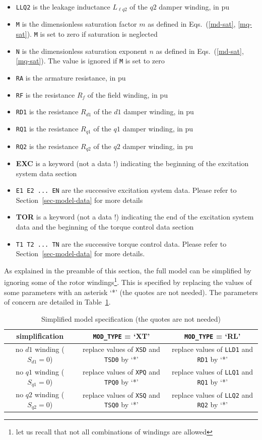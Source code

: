 \begin{itemize}
\item {\tt LLQ2} is the leakage inductance $L_{\ell q2}$ of the $q2$ damper winding, in pu
\item {\tt M} is the dimensionless saturation factor $m$ as defined in Eqs.~(\ref{md-sat}, \ref{mq-sat}). {\tt M} is set to zero if saturation is neglected
\item {\tt N} is the dimensionless saturation exponent $n$ as defined in Eqs.~(\ref{md-sat}, \ref{mq-sat}). The value is ignored if {\tt M} is set to zero
\item {\tt RA} is the armature resistance, in pu
\item {\tt RF} is the resistance $R_f$ of the field winding, in pu
\item {\tt RD1} is the resistance $R_{d1}$ of the $d1$ damper winding, in pu
\item {\tt RQ1} is the resistance $R_{q1}$ of the $q1$ damper winding, in pu
\item {\tt RQ2} is the resistance $R_{q2}$ of the $q2$ damper winding, in pu
\item {\bf EXC} is a keyword (not a data !) indicating the beginning of the excitation system data section
\item {\tt E1 E2 ...\ EN} are the successive excitation system data. Please refer to Section~\ref{sec-model-data} for more details
\item {\bf TOR} is a keyword (not a data !) indicating the end of the excitation system data and the beginning of the torque control data section
\item {\tt T1 T2 ...\ TN} are the successive torque control data. Please refer to Section~\ref{sec-model-data} for more details.
\end{itemize}

As explained in the preamble of this section, the full model can be simplified by ignoring some of the rotor windings\footnote{let us recall that not all combinations of windings are allowed}. This is specified by replacing the values of some parameters with an asterisk `*' (the quotes are not needed). The parameters of concern are detailed in Table~\ref{tab-sync-simplified}.

\begin{table}[htb]
\centering
\caption{Simplified model specification (the quotes are not needed)}\label{tab-sync-simplified}
{\footnotesize
\begin{tabular}{|c|c|c|}
\hline
simplification & {\tt MOD\_TYPE} = `XT' & {\tt MOD\_TYPE} = `RL' \\ \hline
no $d1$ winding ($S_{d1} = 0$) & replace values of {\tt XSD} and {\tt TSD0} by `*' & replace values of {\tt LLD1} and {\tt RD1} by `*' \\
no $q1$ winding ($S_{q1} = 0$) & replace values of {\tt XPQ} and {\tt TPQ0} by `*' & replace values of {\tt LLQ1} and {\tt RQ1} by `*' \\
no $q2$ winding ($S_{q2} = 0$) & replace values of {\tt XSQ} and {\tt TSQ0} by `*' & replace values of {\tt LLQ2} and {\tt RQ2} by `*' \\ \hline
\end{tabular}
}
\end{table}

